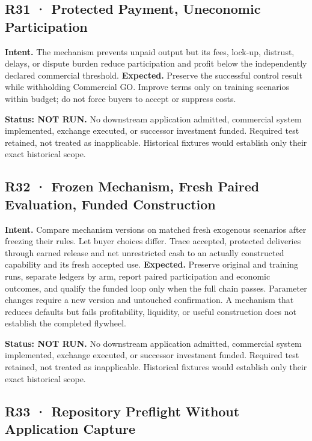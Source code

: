 \documentclass[10pt,letterpaper]{article}
\begin{document}
\hypertarget{r31-protected-payment-uneconomic-participation}{%
\subsection{R31 · Protected Payment, Uneconomic
Participation}\label{r31-protected-payment-uneconomic-participation}}

\textbf{Intent.} The mechanism prevents unpaid output but its fees,
lock-up, distrust, delays, or dispute burden reduce participation and
profit below the independently declared commercial threshold.
\textbf{Expected.} Preserve the successful control result while
withholding Commercial GO. Improve terms only on training scenarios
within budget; do not force buyers to accept or suppress costs.

\textbf{Status: NOT RUN.} No downstream application admitted, commercial
system implemented, exchange executed, or successor investment funded.
Required test retained, not treated as inapplicable. Historical fixtures
would establish only their exact historical scope.

\hypertarget{r32-frozen-mechanism-fresh-paired-evaluation-funded-construction}{%
\subsection{R32 · Frozen Mechanism, Fresh Paired Evaluation, Funded
Construction}\label{r32-frozen-mechanism-fresh-paired-evaluation-funded-construction}}

\textbf{Intent.} Compare mechanism versions on matched fresh exogenous
scenarios after freezing their rules. Let buyer choices differ. Trace
accepted, protected deliveries through earned release and net
unrestricted cash to an actually constructed capability and its fresh
accepted use. \textbf{Expected.} Preserve original and training runs,
separate ledgers by arm, report paired participation and economic
outcomes, and qualify the funded loop only when the full chain passes.
Parameter changes require a new version and untouched confirmation. A
mechanism that reduces defaults but fails profitability, liquidity, or
useful construction does not establish the completed flywheel.

\textbf{Status: NOT RUN.} No downstream application admitted, commercial
system implemented, exchange executed, or successor investment funded.
Required test retained, not treated as inapplicable. Historical fixtures
would establish only their exact historical scope.

\hypertarget{r33-repository-preflight-without-application-capture}{%
\subsection{R33 · Repository Preflight Without Application
Capture}\label{r33-repository-preflight-without-application-capture}}
\end{document}

